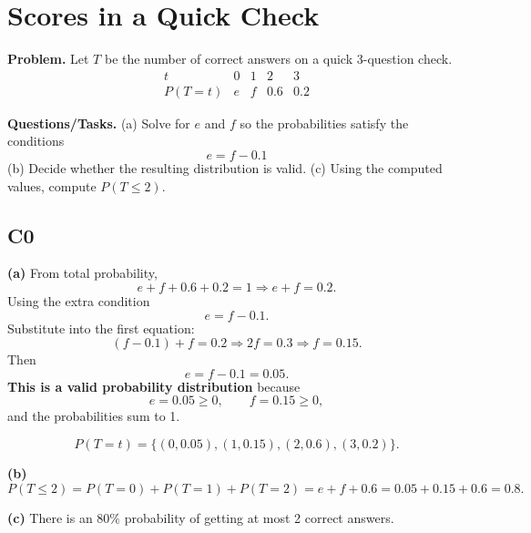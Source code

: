 		
		
		\section{Scores in a Quick Check}
			\textbf{Problem.}
		Let $T$ be the number of correct answers on a quick 3-question check.
		\[
		\begin{array}{c|cccc}
			t & 0 & 1 & 2 & 3\\
			\hline
			P(T=t) & e & f & 0.6 & 0.2
		\end{array}
		\]
		
		\textbf{Questions/Tasks.}
		(a) Solve for $e$ and $f$ so the probabilities satisfy the conditions
		\[ e=f-0.1		\]
		(b) Decide whether the resulting distribution is valid.
		(c) Using the computed values, compute $P(T\le 2)$.
		
		\subsection*{C0}

		\textbf{(a)} From total probability,
		\[
		e+f+0.6+0.2=1\Rightarrow e+f=0.2.
		\]
		Using the extra condition
		\[
		e=f-0.1.
		\]
		Substitute into the first equation:
		\[
		(f-0.1)+f=0.2\Rightarrow 2f=0.3\Rightarrow f=0.15.
		\]
		Then
		\[
		e=f-0.1=0.05.
		\]
		\textbf{This is a valid probability distribution} because
		\[
		e=0.05\ge 0,\qquad f=0.15\ge 0,
		\]
		and the probabilities sum to 1.

		
\[
		P(T=t)=\{(0,0.05),(1,0.15),(2,0.6),(3,0.2)\}.
		\]
\begin{center}
		\end{center}
\textbf{(b)}
		\[
		P(T\le 2)=P(T=0)+P(T=1)+P(T=2)=e+f+0.6=0.05+0.15+0.6=0.8.
		\]
		\begin{center}
		\end{center}
		\textbf{(c)} There is an $80\%$ probability of getting at most 2 correct answers.
		
